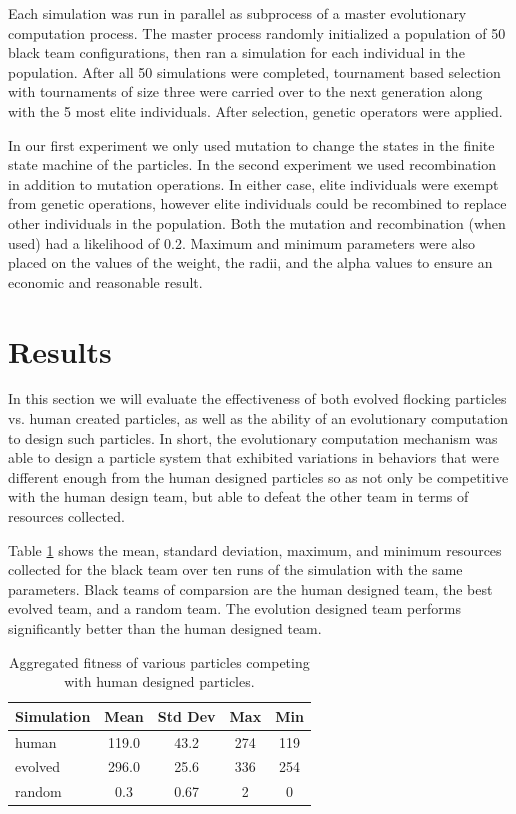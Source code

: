 \documentclass[12pt,journal,compsoc]{IEEEtran}
\begin{document}
Each simulation was run in parallel as subprocess of a master evolutionary computation process. The master process randomly initialized a population of 50 black team configurations, then ran a simulation for each individual in the population. After all 50 simulations were completed, tournament based selection with tournaments of size three were carried over to the next generation along with the 5 most elite individuals. After selection, genetic operators were applied.

In our first experiment we only used mutation to change the states in the finite state machine of the particles. In the second experiment we used recombination in addition to mutation operations. In either case, elite individuals were exempt from genetic operations, however elite individuals could be recombined to replace other individuals in the population. Both the mutation and recombination (when used) had a likelihood of 0.2. Maximum and minimum parameters were also placed on the values of the weight, the radii, and the alpha values to ensure an economic and reasonable result.

\section{Results}

In this section we will evaluate the effectiveness of both evolved flocking particles vs. human created particles, as well as the ability of an evolutionary computation to design such particles. In short, the evolutionary computation mechanism was able to design a particle system that exhibited variations in behaviors that were different enough from the human designed particles so as not only be competitive with the human design team, but able to defeat the other team in terms of resources collected.

Table \ref{table:meanfitness} shows the mean, standard deviation, maximum, and minimum resources collected for the black team over ten runs of the simulation with the same parameters. Black teams of comparsion are the human designed team, the best evolved team, and a random team. The evolution designed team performs significantly better than the human designed team.

\begin{table}
    \renewcommand{\arraystretch}{1.5}
    \centering
    \begin{tabular}{l | c c cc}
        \hline
        Simulation & Mean & Std Dev & Max & Min \\
        \hline
        human & 119.0 & 43.2 & 274 & 119 \\
        evolved & 296.0 & 25.6 & 336 & 254 \\
        random & 0.3 & 0.67 & 2 & 0 \\
        \hline
    \end{tabular}
    \caption{Aggregated fitness of various particles competing with human designed particles.}
    \label{table:meanfitness}
\end{table}
\end{document}
